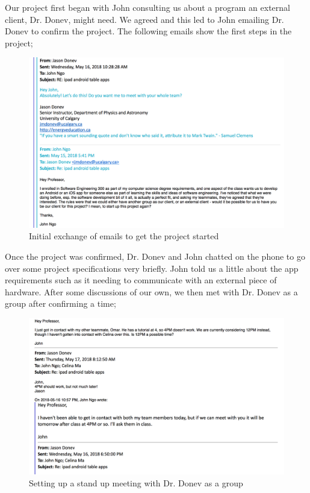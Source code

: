 \documentclass[11pt,a4paper]{article}
\begin{document}
Our project first began with John consulting us about a program an external client, Dr. Donev, might need. We agreed and this led to John emailing Dr. Donev to confirm the project. The following emails show the first steps in the project; 
\bigskip
\begin{figure}[h]
  \centering
      \includegraphics[width=1.1\textwidth]{1.png}
  \caption{Initial exchange of emails to get the project started}
\end{figure}

\newpage
Once the project was confirmed, Dr. Donev and John chatted on the phone to go over some project specifications very briefly. John told us a little about the app requirements such as it needing to communicate with an external piece of hardware. After some discussions of our own, we then met with Dr. Donev as a group after confirming a time;


\bigskip
\begin{figure}[h]
  \centering
      \includegraphics[width=1.1\textwidth]{3.png}

  \caption{Setting up a stand up meeting with Dr. Donev as a group}
\end{figure}
\end{document}
